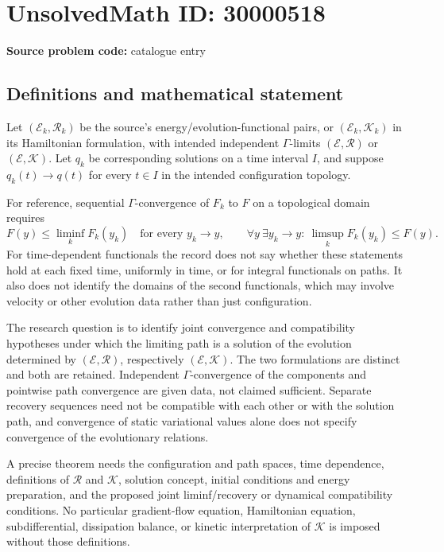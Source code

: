\documentclass[11pt]{article}
\begin{document}
\section*{UnsolvedMath ID: 30000518}
\textbf{Source problem code:} catalogue entry
\subsection{Definitions and mathematical statement}
Let \((\mathcal E_k,\mathcal R_k)\) be the source's energy/evolution-functional pairs, or \((\mathcal E_k,\mathcal K_k)\) in its Hamiltonian formulation, with intended independent \(\Gamma\)-limits \((\mathcal E,\mathcal R)\) or \((\mathcal E,\mathcal K)\). Let \(q_k\) be corresponding solutions on a time interval \(I\), and suppose \(q_k(t)\to q(t)\) for every \(t\in I\) in the intended configuration topology.

For reference, sequential \(\Gamma\)-convergence of \(F_k\) to \(F\) on a topological domain requires
\[
F(y)\leq\liminf_k F_k(y_k)\quad\text{for every }y_k\to y,
\qquad
\forall y\ \exists y_k\to y:\ \limsup_kF_k(y_k)\leq F(y).
\]
For time-dependent functionals the record does not say whether these statements hold at each fixed time, uniformly in time, or for integral functionals on paths. It also does not identify the domains of the second functionals, which may involve velocity or other evolution data rather than just configuration.

The research question is to identify joint convergence and compatibility hypotheses under which the limiting path is a solution of the evolution determined by \((\mathcal E,\mathcal R)\), respectively \((\mathcal E,\mathcal K)\). The two formulations are distinct and both are retained. Independent \(\Gamma\)-convergence of the components and pointwise path convergence are given data, not claimed sufficient. Separate recovery sequences need not be compatible with each other or with the solution path, and convergence of static variational values alone does not specify convergence of the evolutionary relations.

A precise theorem needs the configuration and path spaces, time dependence, definitions of \(\mathcal R\) and \(\mathcal K\), solution concept, initial conditions and energy preparation, and the proposed joint liminf/recovery or dynamical compatibility conditions. No particular gradient-flow equation, Hamiltonian equation, subdifferential, dissipation balance, or kinetic interpretation of \(\mathcal K\) is imposed without those definitions.
\end{document}
